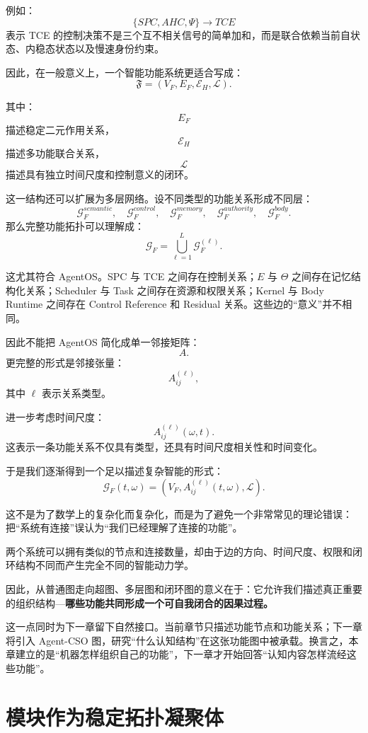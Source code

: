 例如：
\[
\{SPC,AHC,\Psi\}
\rightarrow
TCE
\]
表示 TCE 的控制决策不是三个互不相关信号的简单加和，而是联合依赖当前自状态、内稳态状态以及慢速身份约束。

因此，在一般意义上，一个智能功能系统更适合写成：
\[
\boxed{
\mathfrak F
=
(V_F,E_F,\mathcal E_H,\mathcal L).
}
\]

其中：
\[
E_F
\]
描述稳定二元作用关系，
\[
\mathcal E_H
\]
描述多功能联合关系，
\[
\mathcal L
\]
描述具有独立时间尺度和控制意义的闭环。

这一结构还可以扩展为多层网络。设不同类型的功能关系形成不同层：
\[
\mathcal G_F^{semantic},
\quad
\mathcal G_F^{control},
\quad
\mathcal G_F^{memory},
\quad
\mathcal G_F^{authority},
\quad
\mathcal G_F^{body}.
\]
那么完整功能拓扑可以理解成：
\[
\mathcal G_F
=
\bigcup_{\ell=1}^{L}
\mathcal G_F^{(\ell)}.
\]

这尤其符合 AgentOS。SPC 与 TCE 之间存在控制关系；$E$ 与 $\Theta$ 之间存在记忆结构化关系；Scheduler 与 Task 之间存在资源和权限关系；Kernel 与 Body Runtime 之间存在 Control Reference 和 Residual 关系。这些边的“意义”并不相同。

因此不能把 AgentOS 简化成单一邻接矩阵：
\[
A.
\]
更完整的形式是邻接张量：
\[
A_{ij}^{(\ell)},
\]
其中 $\ell$ 表示关系类型。

进一步考虑时间尺度：
\[
A_{ij}^{(\ell)}(\omega,t).
\]
这表示一条功能关系不仅具有类型，还具有时间尺度相关性和时间变化。

于是我们逐渐得到一个足以描述复杂智能的形式：
\[
\boxed{
\mathcal G_F(t,\omega)
=
\left(
V_F,
A_{ij}^{(\ell)}(t,\omega),
\mathcal L
\right).
}
\]

这不是为了数学上的复杂化而复杂化，而是为了避免一个非常常见的理论错误：把“系统有连接”误认为“我们已经理解了连接的功能”。

两个系统可以拥有类似的节点和连接数量，却由于边的方向、时间尺度、权限和闭环结构不同而产生完全不同的智能动力学。

因此，从普通图走向超图、多层图和闭环图的意义在于：它允许我们描述真正重要的组织结构---\textbf{哪些功能共同形成一个可自我闭合的因果过程。}

这一点同时为下一章留下自然接口。当前章节只描述功能节点和功能关系；下一章将引入 Agent-CSO 图，研究“什么认知结构”在这张功能图中被承载。换言之，本章建立的是“机器怎样组织自己的功能”，下一章才开始回答“认知内容怎样流经这些功能”。


\section{模块作为稳定拓扑凝聚体}

